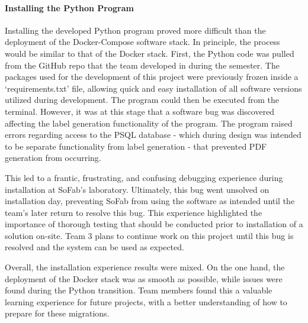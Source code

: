 \documentclass{article}
\begin{document}
\paragraph{Installing the Python Program} Installing the developed Python program proved more difficult than the deployment of the 
Docker-Compose software stack. In principle, the process would be similar to that of the Docker stack. First, the Python code was pulled 
from the GitHub repo that the team developed in during the semester. The packages used for the development of this project were 
previously frozen inside a `requirements.txt' file, allowing quick and easy installation of all software versions utilized during 
development. The program could then be executed from the terminal. However, it was at this stage that a software bug was discovered
affecting the label generation functionality of the program. The program raised errors regarding access to the PSQL database - which 
during design was intended to be separate functionality from label generation - that prevented PDF generation from occurring.

This led to a frantic, frustrating, and confusing debugging experience during installation at SoFab's laboratory. Ultimately, this 
bug went unsolved on installation day, preventing SoFab from using the software as intended until the team's later return to resolve 
this bug. This experience highlighted the importance of thorough testing that should be conducted prior to installation of a 
solution on-site. Team 3 plans to continue work on this project until this bug is resolved and the system can be used as expected.

Overall, the installation experience results were mixed. On the one hand, the deployment of the Docker stack was as smooth as possible, 
while issues were found during the Python transition. Team members found this a valuable learning experience for future projects, 
with a better understanding of how to prepare for these migrations.
\end{document}

